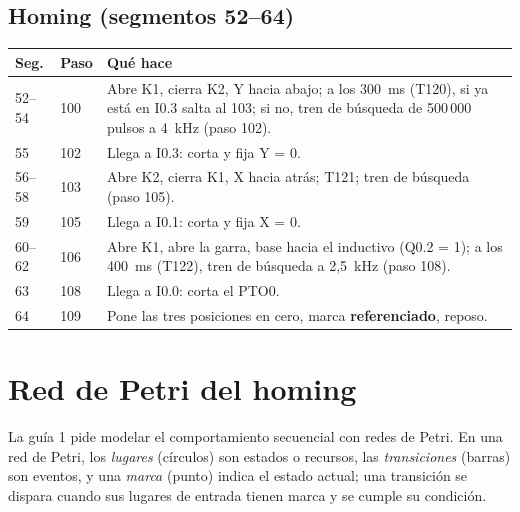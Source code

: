 \subsection{Homing (segmentos 52--64)}
\begin{center}\small
\begin{longtable}{>{\raggedright}p{1.4cm} >{\raggedright}p{1.2cm} >{\raggedright\arraybackslash}p{12.4cm}}
\toprule
\textbf{Seg.} & \textbf{Paso} & \textbf{Qué hace}\\
\midrule
\endhead
52--54 & 100 & Abre K1, cierra K2, Y hacia abajo; a los 300~ms (T120), si ya está en I0.3 salta al 103; si no, tren de búsqueda de 500\,000 pulsos a 4~kHz (paso 102).\\
55 & 102 & Llega a I0.3: corta y fija Y = 0.\\
56--58 & 103 & Abre K2, cierra K1, X hacia atrás; T121; tren de búsqueda (paso 105).\\
59 & 105 & Llega a I0.1: corta y fija X = 0.\\
60--62 & 106 & Abre K1, abre la garra, base hacia el inductivo (Q0.2 = 1); a los 400~ms (T122), tren de búsqueda a 2,5~kHz (paso 108).\\
63 & 108 & Llega a I0.0: corta el PTO0.\\
64 & 109 & Pone las tres posiciones en cero, marca \textbf{referenciado}, reposo.\\
\bottomrule
\end{longtable}
\end{center}

\section{Red de Petri del homing}\label{sec:petri}
La guía 1 pide modelar el comportamiento secuencial con redes de Petri. En una red de Petri, los \emph{lugares} (círculos) son estados o recursos, las \emph{transiciones} (barras) son eventos, y una \emph{marca} (punto) indica el estado actual; una transición se dispara cuando sus lugares de entrada tienen marca y se cumple su condición.

